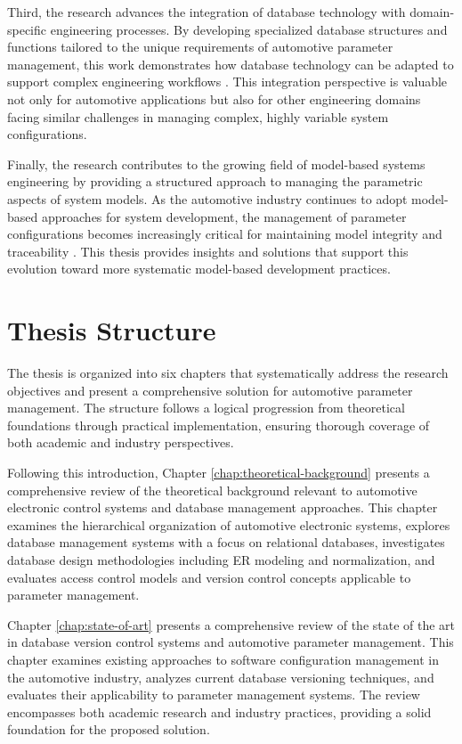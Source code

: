 Third, the research advances the integration of database technology with domain-specific engineering processes. By developing specialized database structures and functions tailored to the unique requirements of automotive parameter management, this work demonstrates how database technology can be adapted to support complex engineering workflows \cite{sciore2009database}. This integration perspective is valuable not only for automotive applications but also for other engineering domains facing similar challenges in managing complex, highly variable system configurations.

Finally, the research contributes to the growing field of model-based systems engineering by providing a structured approach to managing the parametric aspects of system models. As the automotive industry continues to adopt model-based approaches for system development, the management of parameter configurations becomes increasingly critical for maintaining model integrity and traceability \cite{staron2021automotive}. This thesis provides insights and solutions that support this evolution toward more systematic model-based development practices.

\section{Thesis Structure}
\label{sec:structure}

The thesis is organized into six chapters that systematically address the research objectives and present a comprehensive solution for automotive parameter management. The structure follows a logical progression from theoretical foundations through practical implementation, ensuring thorough coverage of both academic and industry perspectives.

Following this introduction, Chapter \ref{chap:theoretical-background} presents a comprehensive review of the theoretical background relevant to automotive electronic control systems and database management approaches. This chapter examines the hierarchical organization of automotive electronic systems, explores database management systems with a focus on relational databases, investigates database design methodologies including \ac{ER} modeling and normalization, and evaluates access control models and version control concepts applicable to parameter management.

Chapter \ref{chap:state-of-art} presents a comprehensive review of the state of the art in database version control systems and automotive parameter management. This chapter examines existing approaches to software configuration management in the automotive industry, analyzes current database versioning techniques, and evaluates their applicability to parameter management systems. The review encompasses both academic research and industry practices, providing a solid foundation for the proposed solution.

